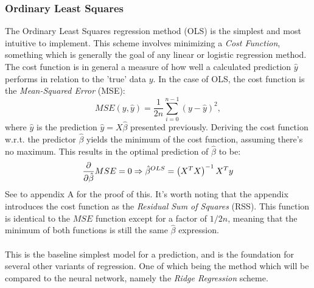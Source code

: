         \subsubsection{Ordinary Least Squares}
            The Ordinary Least Squares regression method (OLS) is the simplest and most intuitive to implement. This scheme involves minimizing a \textit{Cost Function}, something which is generally the goal of any linear or logistic regression method. The cost function is in general a measure of how well a calculated prediction $\hat{y}$ performs in relation to the 'true' data $y$. In the case of OLS, the cost function is the \textit{Mean-Squared Error} (MSE):
            \begin{equation}\label{eq:MSE}
                MSE(y, \hat{y})=\frac1{2n}\sum_{i=0}^{n-1} \left( y-\hat{y} \right)^2,
            \end{equation}
            where $\hat{y}$ is the prediction $\hat{y}=X\hat{\beta}$ presented previously. Deriving the cost function w.r.t. the predictor $\hat{\beta}$ yields the minimum of the cost function, assuming there's no maximum. This results in the optimal prediction of $\hat{\beta}$ to be:
            \begin{equation}
                \pdv{}{\hat{\beta}}MSE=0\Rightarrow \hat{\beta}^{OLS} = \left( X^TX \right)^{-1}X^Ty
            \end{equation}
            See to appendix A for the proof of this\cite{5}. It's worth noting that the appendix introduces the cost function as the \textit{Residual Sum of Squares} (RSS). This function is identical to the $MSE$ function except for a factor of $1/2n$, meaning that the minimum of both functions is still the same $\hat{\beta}$ expression. \\\\
            This is the baseline simplest model for a prediction, and is the foundation for several other variants of regression. One of which being the method which will be compared to the neural network, namely the \textit{Ridge Regression} scheme.
            
